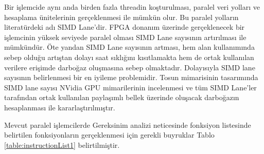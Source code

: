 Bir işlemcide aynı anda birden fazla threadin koşturulması, paralel veri yolları ve hesaplama ünitelerinin gerçeklenmesi ile mümkün olur. Bu paralel yolların literatürdeki adı SIMD Lane'dir. FPGA donanım üzerinde gerçeklenecek bir işlemcinin yüksek seviyede paralel olması SIMD Lane sayısının artırılması ile mümkündür. Öte yandan SIMD Lane sayısının artması, hem alan kullanımında sebep olduğu artıştan dolayı saat sıklığını kısıtlamakta hem de ortak kullanılan verilere erişimde darboğaz oluşmasına sebep olmaktadır. Dolayısıyla SIMD lane sayısının belirlenmesi bir en iyileme problemidir. Tosun mimarisinin tasarımında SIMD lane sayısı NVidia GPU mimarilerinin incelenmesi ve tüm SIMD Lane'ler tarafından ortak kullanılan paylaşımlı bellek üzerinde oluşacak darboğazın hesaplanması ile kararlaştırılmıştır. \par

Mevcut paralel işlemcilerde  Gereksinim analizi neticesinde fonksiyon listesinde belirtilen fonksiyonların gerçeklenmesi için gerekli buyruklar Tablo \ref{table:instructionList1} belirtilmiştir. 
